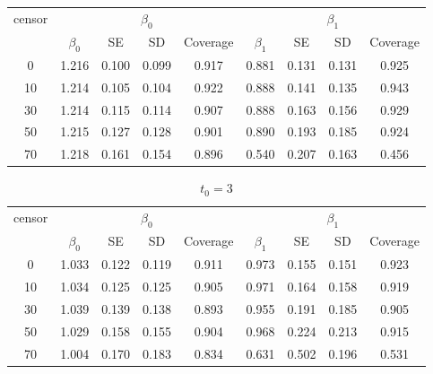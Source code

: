 \documentclass[12pt]{article}
\begin{document}
\begin{enumerate}
\begin{table}[hbt!]
\begin{tabular}{|c|c|c|c|c|c|c|c|c|}
				\multirow{2}{*}{censor} & \multicolumn{4}{c|}{$\beta_0$} & \multicolumn{4}{c|}{$\beta_1$}\\ \cline{2-9}
				& $\beta_0$ & SE & SD  & Coverage  & $\beta_1$ & SE & SD & Coverage\\
				\hline\hline
				0 & 1.216 & 0.100 & 0.099 & 0.917 & 0.881 & 0.131 & 0.131 & 0.925 \\ 
  10 & 1.214 & 0.105 & 0.104 & 0.922 & 0.888 & 0.141 & 0.135 & 0.943 \\ 
  30 & 1.214 & 0.115 & 0.114 & 0.907 & 0.888 & 0.163 & 0.156 & 0.929 \\ 
  50 & 1.215 & 0.127 & 0.128 & 0.901 & 0.890 & 0.193 & 0.185 & 0.924 \\ 
  70 & 1.218 & 0.161 & 0.154 & 0.896 & 0.540 & 0.207 & 0.163 & 0.456 \\ 
				\hline
			\end{tabular}
		\end{table}
		\begin{table}[hbt!]
			\caption{$t_0=3$}
			\centering
			\begin{tabular}{|c|c|c|c|c|c|c|c|c|}
				\hline
				\multirow{2}{*}{censor} & \multicolumn{4}{c|}{$\beta_0$} & \multicolumn{4}{c|}{$\beta_1$}\\ \cline{2-9}
				& $\beta_0$ & SE & SD  & Coverage  & $\beta_1$ & SE & SD & Coverage\\
				\hline\hline
				0 & 1.033 & 0.122 & 0.119 & 0.911 & 0.973 & 0.155 & 0.151 & 0.923 \\ 
  10 & 1.034 & 0.125 & 0.125 & 0.905 & 0.971 & 0.164 & 0.158 & 0.919 \\ 
  30 & 1.039 & 0.139 & 0.138 & 0.893 & 0.955 & 0.191 & 0.185 & 0.905 \\ 
  50 & 1.029 & 0.158 & 0.155 & 0.904 & 0.968 & 0.224 & 0.213 & 0.915 \\ 
  70 & 1.004 & 0.170 & 0.183 & 0.834 & 0.631 & 0.502 & 0.196 & 0.531 \\ 
				\hline
			\end{tabular}
		\end{table}
		
		\newpage
		

\end{enumerate}
\end{document}
